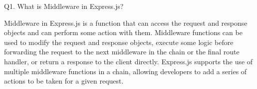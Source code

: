 Q1. What is Middleware in Express.js?

     Middleware in Express.js is a function that can access the request and response objects
and can perform some action with them. Middleware functions can be used to modify the
request and response objects, execute some logic before forwarding the request to the 
next middleware in the chain or the final route handler, or return a response to the
client directly. Express.js supports the use of multiple middleware functions in a chain,
 allowing developers to add a series of actions to be taken for a given request.



